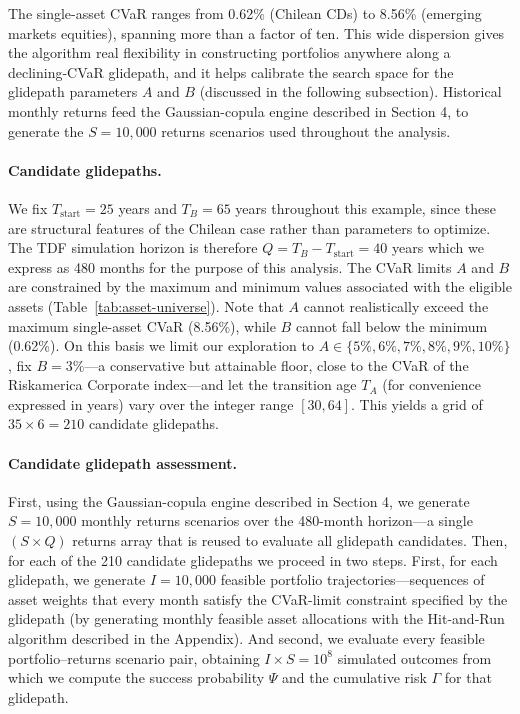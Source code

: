 \documentclass[11pt]{article}
\newcommand{\Tstart}{T_{\mathrm{start}}}
\newcommand{\TA}{T_{A}}
\newcommand{\TB}{T_{B}}
\begin{document}
The single-asset CVaR ranges from 0.62\% (Chilean CDs) to 8.56\% (emerging markets equities), spanning more than a factor of ten. This wide dispersion gives the algorithm real flexibility in constructing portfolios anywhere along a declining-CVaR glidepath, and it helps calibrate the search space for the glidepath parameters $A$ and $B$ (discussed in the following subsection). Historical monthly returns feed the Gaussian-copula engine described in Section 4, to generate the $S=10{,}000$ returns scenarios used throughout the analysis.

\paragraph{Candidate  glidepaths.}
We fix $\Tstart=25$ years and $\TB=65$ years throughout this example, since these are structural features of the Chilean case rather than parameters to optimize. The TDF simulation horizon is therefore $Q=\TB-\Tstart=40$ years which we express as 480 months for the purpose of this analysis. The CVaR limits $A$ and $B$ are constrained by the maximum and minimum values associated with the eligible assets (Table~\ref{tab:asset-universe}).  Note that $A$ cannot realistically  exceed the maximum single-asset CVaR (8.56\%), while $B$ cannot fall below the minimum (0.62\%). On this basis we limit our exploration to $A \in \{5\%,6\%,7\%,8\%,9\%,10\%\}$, fix $B=3\%$---a conservative but attainable floor, close to the CVaR of the Riskamerica Corporate index---and let the transition age $\TA$ (for convenience expressed in years) vary over the integer range $[30,64]$. This yields a grid of $35 \times 6 = 210$ candidate glidepaths.

\paragraph{Candidate glidepath assessment.}



 First, using the Gaussian-copula engine described in Section 4, we generate $S=10{,}000$ monthly returns scenarios over the 480-month horizon---a single $(S \times Q)$ returns array that is reused to evaluate all glidepath candidates. Then, for each of the 210 candidate glidepaths we proceed in two steps.  First, for each glidepath, we generate $I=10{,}000$ feasible portfolio trajectories---sequences of asset weights that every month satisfy the CVaR-limit constraint specified by the glidepath (by generating monthly feasible asset allocations with the Hit-and-Run algorithm described in the Appendix).  And second,  we evaluate every feasible portfolio--returns scenario pair, obtaining $I \times S=10^8$ simulated outcomes from which we compute the success probability $\Psi$ and the cumulative risk $\Gamma$ for that glidepath.
 
\end{document}
